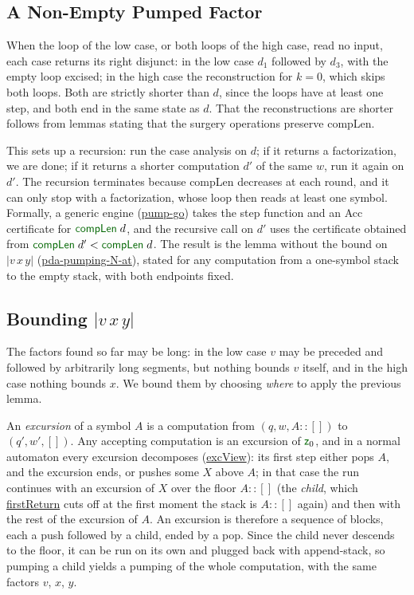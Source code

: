\documentclass[runningheads]{llncs}
\newcommand{\blueFG}[1]{\textcolor[rgb]{0,0,0.8}{#1}}
\newcommand{\greenFG}[1]{\textcolor[rgb]{0,0.4,0}{#1}}
\newcommand{\D}[1]{{\blueFG{\textsf{#1}}}}      %
\newcommand{\F}[1]{{\greenFG{\textsf{#1}}}}     %
\newcommand{\agdarev}{9ac99a00bb1dc0047eca6ac9ab8f15585acb3577}
\newcommand{\agdarepo}{https://github.com/lives-group/pda-pumping/blob/\agdarev/src}
\newcommand{\agdalink}[3]{\href{\agdarepo/#1\#L#2}{\F{#3}}}
\begin{document}
\subsection{A Non-Empty Pumped Factor}\label{sec:vy}

When the loop of the low case, or both loops of the high case, read no input,
each case returns its right disjunct: in the low case $d_1$ followed by $d_3$,
with the empty loop excised; in the high case the reconstruction for $k = 0$,
which skips both loops. Both are strictly shorter than $d$, since the loops have
at least one step, and both end in the same state as $d$. That the
reconstructions are shorter follows from lemmas stating that the surgery
operations preserve \F{compLen}.

This sets up a recursion: run the case analysis on $d$; if it returns a
factorization, we are done; if it returns a shorter computation $d'$ of the same
$w$, run it again on $d'$. The recursion terminates because \F{compLen} decreases
at each round, and it can only stop with a factorization, whose loop then reads
at least one symbol. Formally, a generic engine
(\agdalink{PDA/Pumping/PumpN.agda}{32}{pump-go}) takes the step function and an
\D{Acc} certificate for $\F{compLen}\;d$, and the recursive call on $d'$ uses the
certificate obtained from $\F{compLen}\;d' < \F{compLen}\;d$. The result is the
lemma without the bound on $|v\,x\,y|$
(\agdalink{PDA/Pumping/PumpNormal.agda}{75}{pda-pumping-N-at}), stated for any
computation from a one-symbol stack to the empty stack, with both endpoints
fixed.

\subsection{Bounding $|v\,x\,y|$}\label{sec:bounded}

The factors found so far may be long: in the low case $v$ may be preceded and
followed by arbitrarily long segments, but nothing bounds $v$ itself, and in the
high case nothing bounds $x$. We bound them by choosing \emph{where} to apply the
previous lemma.

An \emph{excursion} of a symbol $A$ is a computation from
$(q , w , A :: []) $ to $(q' , w' , [])$. Any accepting computation is an
excursion of $\F{z}_0$, and in a normal automaton every excursion decomposes
(\agdalink{PDA/Pumping/Excursion.agda}{146}{excView}): its first step either pops
$A$, and the excursion ends, or pushes some $X$ above $A$; in that case the run
continues with an excursion of $X$ over the floor $A :: []$ (the \emph{child},
which \agdalink{PDA/Pumping/Excursion.agda}{83}{firstReturn} cuts off at the
first moment the stack is $A :: []$ again) and then with the rest of the
excursion of $A$. An excursion is therefore a sequence of blocks, each a push
followed by a child, ended by a pop. Since the child never descends to the
floor, it can be run on its own and plugged back with \F{append-stack}, so
pumping a child yields a pumping of the whole computation, with the same factors
$v$, $x$, $y$.
\end{document}
